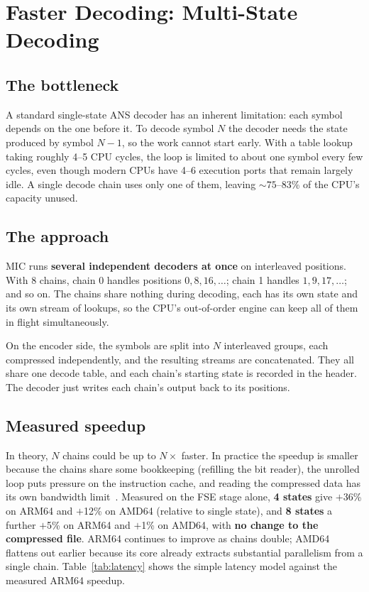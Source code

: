 \documentclass[journal]{IEEEtran}
\begin{document}
\section{Faster Decoding: Multi-State Decoding}
\label{sec:multistate}

\subsection{The bottleneck}

A standard single-state ANS decoder has an inherent limitation: each symbol
depends on the one before it. To decode symbol $N$ the decoder needs the state
produced by symbol $N-1$, so the work cannot start early. With a table lookup
taking roughly 4--5 CPU cycles, the loop is limited to about one symbol every
few cycles, even though modern CPUs have 4--6 execution ports that remain
largely idle. A single decode chain uses only one of them, leaving
${\sim}75$--83\% of the CPU's capacity unused.

\subsection{The approach}

MIC runs \textbf{several independent decoders at once} on interleaved
positions. With 8 chains, chain 0 handles positions $0, 8, 16, \ldots$; chain 1
handles $1, 9, 17, \ldots$; and so on. The chains share nothing during
decoding, each has its own state and its own stream of lookups, so the CPU's
out-of-order engine can keep all of them in flight simultaneously.

On the encoder side, the symbols are split into $N$ interleaved groups, each
compressed independently, and the resulting streams are concatenated. They
all share one decode table, and each chain's starting state is recorded in
the header. The decoder just writes each chain's output back to its
positions.

\subsection{Measured speedup}

In theory, $N$ chains could be up to $N\times$ faster. In practice the speedup
is smaller because the chains share some bookkeeping (refilling the bit
reader), the unrolled loop puts pressure on the instruction cache, and reading
the compressed data has its own bandwidth limit~\cite{williams2009}. Measured
on the FSE stage alone, \textbf{4 states} give $+$36\% on ARM64 and $+$12\% on
AMD64 (relative to single state), and \textbf{8 states} a further $+$5\% on
ARM64 and $+$1\% on AMD64, with \textbf{no change to the compressed file}.
ARM64 continues to improve as chains double; AMD64 flattens out earlier because
its core already extracts substantial parallelism from a single chain.
Table~\ref{tab:latency} shows the simple latency model against the measured
ARM64 speedup.
\end{document}
